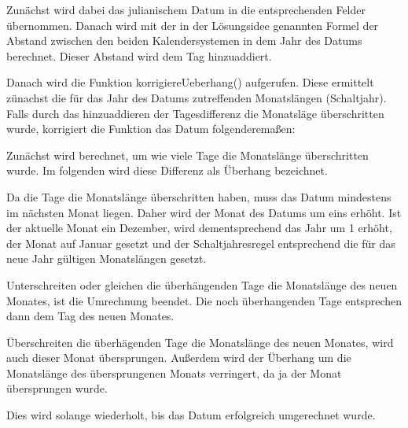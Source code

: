 	Zunächst wird dabei das julianischem Datum in die entsprechenden Felder übernommen. Danach wird mit der in der Lösungsidee genannten Formel der Abstand zwischen den beiden Kalendersystemen in dem Jahr des Datums berechnet. Dieser Abstand wird dem Tag hinzuaddiert. 

	Danach wird die Funktion korrigiereUeberhang() aufgerufen. Diese ermittelt zünachst die für das Jahr des Datums zutreffenden Monatslängen (Schaltjahr). Falls durch das hinzuaddieren der Tagesdifferenz die Monatsläge überschritten wurde, korrigiert die Funktion das Datum folgenderemaßen:

	Zunächst wird berechnet, um wie viele Tage die Monatslänge überschritten wurde. Im folgenden wird diese Differenz als Überhang bezeichnet.

	Da die Tage die Monatslänge überschritten haben, muss das Datum mindestens im nächsten Monat liegen. Daher wird der Monat des Datums um eins erhöht. Ist der aktuelle Monat ein Dezember, wird dementsprechend das Jahr um 1 erhöht, der Monat auf Januar gesetzt und der Schaltjahresregel entsprechend die für das neue Jahr gültigen Monatslängen gesetzt.

	Unterschreiten oder gleichen die überhängenden Tage die Monatslänge des neuen Monates, ist die Umrechnung beendet. Die noch überhangenden Tage entsprechen dann dem Tag des neuen Monates.

	Überschreiten die überhägenden Tage die Monatslänge des neuen Monates, wird auch dieser Monat übersprungen. Außerdem wird der Überhang um die Monatslänge des übersprungenen Monats verringert, da ja der Monat übersprungen wurde.

	Dies wird solange wiederholt, bis das Datum erfolgreich umgerechnet wurde.